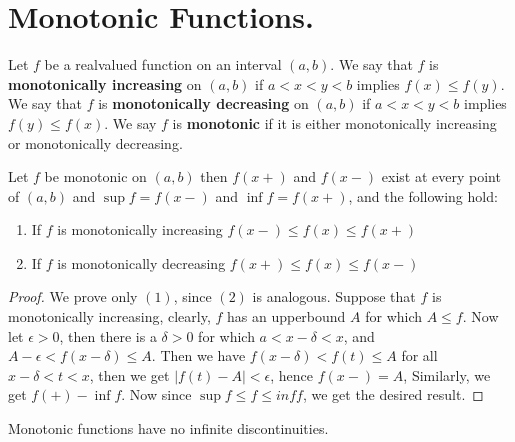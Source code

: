 
\section{Monotonic Functions.}

\begin{definition}
    Let $f$ be a realvalued function on an interval  $(a,b)$. We say that  $f$ is 
    \textbf{monotonically increasing} on $(a,b)$ if  $a<x<y<b$ implies  $f(x) \leq f(y)$. 
    We say that  $f$ is \textbf{monotonically decreasing} on $(a,b)$ if  $a<x<y<b$ 
    implies  $f(y) \leq f(x)$. We say $f$ is \textbf{monotonic} if it is either monotonically 
    increasing or monotonically decreasing.
\end{definition}

\begin{theorem}\label{5.6.1}
    Let $f$ be monotonic on $(a,b)$ then $f(x+)$ and  $f(x-)$ exist at every point of 
    $(a,b)$ and $\sup{f}=f(x-)$ and  $\inf{f}=f(x+)$, and the following hold:
        \begin{enumerate}[label=(\arabic*)]
            \begin{enumerate}[label=(\arabic*)]
                \item If $f$ is monotonically increasing $f(x-) \leq f(x) \leq f(x+)$

                \item If $f$ is monotonically decreasing $f(x+) \leq f(x) \leq f(x-)$
            \end{enumerate}		
        \end{enumerate}
\end{theorem}
\begin{proof}
    We prove only $(1)$, since  $(2)$ is analogous. Suppose that $f$ is monotonically 
    increasing, clearly,  $f$ has an upperbound  $A$ for which  $A \leq f$. Now let  $\epsilon>0$, 
    then there is a  $\delta>0$ for which  $a<x-\delta<x$, and  $A-\epsilon<f(x-\delta) \leq A$.  Then we have 
    $f(x-\delta)<f(t) \leq A$ for all  $x-\delta<t<x$, then we get  $|f(t)-A|<\epsilon$, hence 
    $f(x-)=A$, Similarly, we get  $f(+)-\inf{f}$. Now since  $\sup{f} \leq f \leq inf{f}$, 
    we get the desired result.
\end{proof}

\begin{corollary}
    Monotonic functions have no infinite discontinuities.		
\end{corollary}

